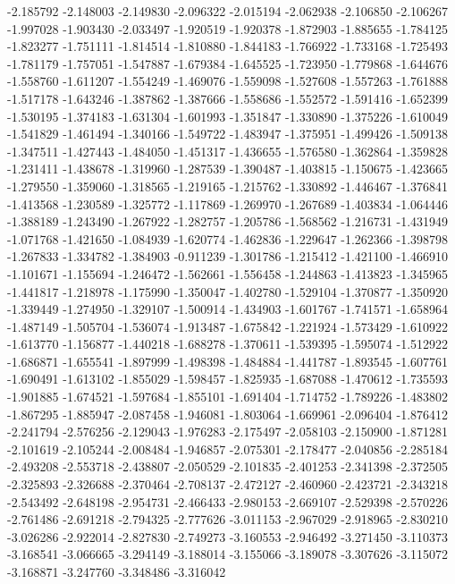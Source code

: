 -2.185792
-2.148003
-2.149830
-2.096322
-2.015194
-2.062938
-2.106850
-2.106267
-1.997028
-1.903430
-2.033497
-1.920519
-1.920378
-1.872903
-1.885655
-1.784125
-1.823277
-1.751111
-1.814514
-1.810880
-1.844183
-1.766922
-1.733168
-1.725493
-1.781179
-1.757051
-1.547887
-1.679384
-1.645525
-1.723950
-1.779868
-1.644676
-1.558760
-1.611207
-1.554249
-1.469076
-1.559098
-1.527608
-1.557263
-1.761888
-1.517178
-1.643246
-1.387862
-1.387666
-1.558686
-1.552572
-1.591416
-1.652399
-1.530195
-1.374183
-1.631304
-1.601993
-1.351847
-1.330890
-1.375226
-1.610049
-1.541829
-1.461494
-1.340166
-1.549722
-1.483947
-1.375951
-1.499426
-1.509138
-1.347511
-1.427443
-1.484050
-1.451317
-1.436655
-1.576580
-1.362864
-1.359828
-1.231411
-1.438678
-1.319960
-1.287539
-1.390487
-1.403815
-1.150675
-1.423665
-1.279550
-1.359060
-1.318565
-1.219165
-1.215762
-1.330892
-1.446467
-1.376841
-1.413568
-1.230589
-1.325772
-1.117869
-1.269970
-1.267689
-1.403834
-1.064446
-1.388189
-1.243490
-1.267922
-1.282757
-1.205786
-1.568562
-1.216731
-1.431949
-1.071768
-1.421650
-1.084939
-1.620774
-1.462836
-1.229647
-1.262366
-1.398798
-1.267833
-1.334782
-1.384903
-0.911239
-1.301786
-1.215412
-1.421100
-1.466910
-1.101671
-1.155694
-1.246472
-1.562661
-1.556458
-1.244863
-1.413823
-1.345965
-1.441817
-1.218978
-1.175990
-1.350047
-1.402780
-1.529104
-1.370877
-1.350920
-1.339449
-1.274950
-1.329107
-1.500914
-1.434903
-1.601767
-1.741571
-1.658964
-1.487149
-1.505704
-1.536074
-1.913487
-1.675842
-1.221924
-1.573429
-1.610922
-1.613770
-1.156877
-1.440218
-1.688278
-1.370611
-1.539395
-1.595074
-1.512922
-1.686871
-1.655541
-1.897999
-1.498398
-1.484884
-1.441787
-1.893545
-1.607761
-1.690491
-1.613102
-1.855029
-1.598457
-1.825935
-1.687088
-1.470612
-1.735593
-1.901885
-1.674521
-1.597684
-1.855101
-1.691404
-1.714752
-1.789226
-1.483802
-1.867295
-1.885947
-2.087458
-1.946081
-1.803064
-1.669961
-2.096404
-1.876412
-2.241794
-2.576256
-2.129043
-1.976283
-2.175497
-2.058103
-2.150900
-1.871281
-2.101619
-2.105244
-2.008484
-1.946857
-2.075301
-2.178477
-2.040856
-2.285184
-2.493208
-2.553718
-2.438807
-2.050529
-2.101835
-2.401253
-2.341398
-2.372505
-2.325893
-2.326688
-2.370464
-2.708137
-2.472127
-2.460960
-2.423721
-2.343218
-2.543492
-2.648198
-2.954731
-2.466433
-2.980153
-2.669107
-2.529398
-2.570226
-2.761486
-2.691218
-2.794325
-2.777626
-3.011153
-2.967029
-2.918965
-2.830210
-3.026286
-2.922014
-2.827830
-2.749273
-3.160553
-2.946492
-3.271450
-3.110373
-3.168541
-3.066665
-3.294149
-3.188014
-3.155066
-3.189078
-3.307626
-3.115072
-3.168871
-3.247760
-3.348486
-3.316042
